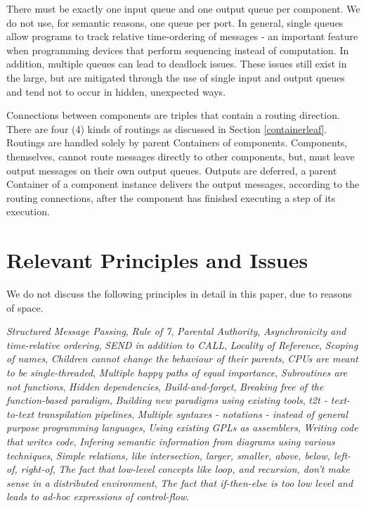 \documentclass[10pt,anonymous,review]{acmart}
\begin{document}
There must be exactly one input queue and one output queue per component. We
do not use, for semantic reasons, one queue per port. In general, single
queues allow programs to track relative time-ordering of messages - an
important feature when programming devices that perform sequencing
instead of computation. In addition, multiple queues can lead to
deadlock issues. These issues still exist in the large, but are
mitigated through the use of single input and output queues and tend not
to occur in hidden, unexpected ways.

Connections between components are triples that contain a routing direction.
There are four (4) kinds of routings as discussed in Section \ref{containerleaf}.
Routings are handled solely by parent Containers of components. Components, themselves, cannot route messages directly to other components, but, must leave output messages on their own output queues. Outputs are deferred, a parent Container of a component instance delivers the output messages, according to the routing connections, after the component has finished executing a step of its execution.


\section{Relevant Principles and Issues}
We do not discuss the following principles in detail in this paper, due
to reasons of space.

\emph{Structured Message Passing},
\emph{Rule of 7},
\emph{Parental Authority},
\emph{Asynchronicity and time-relative ordering},
\emph{SEND in addition to CALL},
\emph{Locality of Reference},
\emph{Scoping of names},
\emph{Children cannot change the behaviour of their parents},
\emph{CPUs are meant to be single-threaded},
\emph{Multiple happy paths of equal importance},
\emph{Subroutines are not functions},
\emph{Hidden dependencies},
\emph{Build-and-forget},
\emph{Breaking free of the function-based paradigm},
\emph{Building new paradigms using existing tools},
\emph{t2t - text-to-text transpilation pipelines},
\emph{Multiple syntaxes - notations - instead of general purpose programming languages},
\emph{Using existing GPLs as assemblers},
\emph{Writing code that writes code},
\emph{Infering semantic information from diagrams using various techniques},
\emph{Simple relations, like intersection, larger, smaller, above, below, left-of, right-of},
\emph{The fact that low-level concepts like \emph{loop}, and \emph{recursion}, don't make sense in a distributed environment},
\emph{The fact that \emph{if-then-else} is too low level and leads to ad-hoc expressions of control-flow}.
\end{document}
